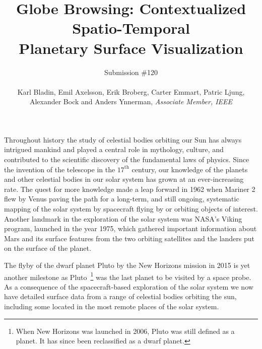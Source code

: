 \documentclass[journal]{vgtc}                %
\title{Globe Browsing: Contextualized Spatio-Temporal \\
Planetary Surface Visualization}
\author{Submission \#120 \\
\\
Karl Bladin, Emil Axelsson, Erik Broberg, Carter Emmart, Patric Ljung, \\ Alexander Bock and Anders Ynnerman, \textit{Associate Member, IEEE}}
\newcommand{\kallecomment}[1]{\textbf{[-Kalle-~}
    \textcolor{orange}{#1}
    \textbf{~]}}
\newcommand{\emilcomment}[1]{\textbf{[-Emil-~}
    \textcolor{red}{#1}
    \textbf{~]}}
\newcommand{\alexcomment}[1]{\textbf{[-Alex-~}
    \textcolor{magenta}{#1}
    \textbf{~]}}
\begin{document}

 \label{sec:introduction}
\maketitle


Throughout history the study of celestial bodies orbiting our Sun has always intrigued mankind and played a central role in mythology, culture, and contributed to the scientific discovery of the fundamental laws of physics.
Since the invention of the telescope in the $17^{\textrm{th}}$ century, our knowledge of the planets and other celestial bodies in our solar system has grown at an ever-increasing rate.
The quest for more knowledge made a leap forward in 1962 when Mariner 2 flew by Venus paving the path for a long-term, and still ongoing, systematic mapping of the solar system by spacecraft flying by or orbiting objects of interest.
Another landmark in the exploration of the solar system was NASA's Viking program, launched in the year 1975, which gathered important information about Mars and its surface features from the two orbiting satellites and the landers put on the surface of the planet.

The flyby of the dwarf planet Pluto by the New Horizons mission in 2015 is yet another milestone as Pluto~\footnote{When New Horizons was launched in 2006, Pluto was still defined as a planet. It has since been reclassified as a dwarf planet.} was the last planet to be visited by a space probe. As a consequence of the spacecraft-based exploration of the solar system we now have detailed surface data from a range of celestial bodies orbiting the sun, including some located in the most remote places of the solar system. 
\end{document}
